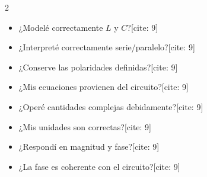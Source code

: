 \documentclass[11pt, a4paper]{article}
\begin{document}
\vspace{2cm}
\begin{tcolorbox}[colback=white, colframe=black, title=\textbf{Auditoría Autónoma (Antes de entregar)[cite: 9]}]
    \begin{multicols}{2}
    \begin{itemize}
        \setlength{\itemsep}{0pt}
        \item[$\square$] ¿Modelé correctamente $L$ y $C$?[cite: 9]
        \item[$\square$] ¿Interpreté correctamente serie/paralelo?[cite: 9]
        \item[$\square$] ¿Conserve las polaridades definidas?[cite: 9]
        \item[$\square$] ¿Mis ecuaciones provienen del circuito?[cite: 9]
        \item[$\square$] ¿Operé cantidades complejas debidamente?[cite: 9]
        \item[$\square$] ¿Mis unidades son correctas?[cite: 9]
        \item[$\square$] ¿Respondí en magnitud y fase?[cite: 9]
        \item[$\square$] ¿La fase es coherente con el circuito?[cite: 9]
    \end{itemize}
    \end{multicols}
\end{tcolorbox}
\end{document}
